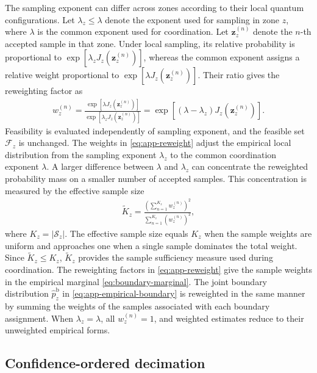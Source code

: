 \documentclass[journal]{IEEEtran}
\begin{document}
{The sampling exponent can differ across zones according to their local quantum configurations. Let $\lambda_z\leq\lambda$ denote the exponent
used for sampling in zone $z$, where $\lambda$ is the common exponent used for coordination. Let $\bm z_z^{(n)}$ denote the $n$-th accepted
sample in that zone. Under local sampling, its relative probability is proportional to $\exp[\lambda_z J_z(\bm z_z^{(n)})]$, whereas the common exponent assigns a relative weight proportional to $\exp[\lambda J_z(\bm z_z^{(n)})]$. Their ratio gives the reweighting factor as
\begin{align}
w_z^{(n)}=\frac{\exp[\lambda J_z(\bm z_z^{(n)})]}{\exp[\lambda_z J_z(\bm z_z^{(n)})]}=\exp\!\left[(\lambda-\lambda_z)J_z(\bm z_z^{(n)})\right].
\label{eq:app-reweight}
\end{align}
Feasibility is evaluated independently of sampling exponent, and the feasible set $\mathcal F_z$ is unchanged. The weights in \eqref{eq:app-reweight} adjust the empirical local distribution from the sampling exponent $\lambda_z$ to the common coordination exponent $\lambda$.
A larger difference between $\lambda$ and $\lambda_z$ can concentrate the reweighted probability mass on a smaller number of accepted samples. This concentration is measured by the effective sample size
\begin{align}
\widetilde K_z=\frac{(\sum_{n=1}^{K_z}w_z^{(n)})^2}{\sum_{n=1}^{K_z}(w_z^{(n)})^2},
\label{eq:app-ess}
\end{align}
where $K_z=|\mathcal S_z|$. The effective sample size equals $K_z$ when the sample weights are uniform and approaches one when a single sample dominates the total weight. Since $\widetilde K_z\leq K_z$, $\widetilde K_z$ provides the sample sufficiency measure used during coordination.
The reweighting factors in \eqref{eq:app-reweight} give the sample weights in the empirical marginal \eqref{eq:boundary-marginal}. The joint boundary distribution $\widehat p_z^{\mathrm b}$ in \eqref{eq:app-empirical-boundary} is reweighted in the same manner by summing the weights of the samples associated with each boundary assignment. When $\lambda_z=\lambda$, all $w_z^{(n)}=1$, and weighted estimates reduce to their unweighted empirical forms.

\vspace{-3mm}
\subsection{Confidence-ordered decimation}
\label{app:decimation}

}
\end{document}
